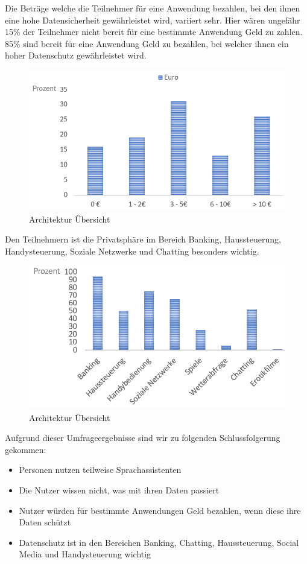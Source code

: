 Die Beträge welche die Teilnehmer für eine Anwendung bezahlen, bei den ihnen eine hohe Datensicherheit gewährleistet wird, variiert sehr. Hier wären ungefähr 15\% der Teilnehmer nicht bereit für eine bestimmte Anwendung Geld zu zahlen. 85\% sind bereit für eine Anwendung Geld zu bezahlen, bei welcher ihnen ein hoher Datenschutz gewährleistet wird. 

\begin{figure}[h!]
	\centering
	\includegraphics[width=0.7\linewidth]{Picture/umfrage_betrag}
	\caption[Architektur Übersicht]{Architektur Übersicht}
	\label{fig:umfrage_betrag}
\end{figure}

Den Teilnehmern ist die Privatsphäre im Bereich Banking, Haussteuerung, Handysteuerung, Soziale Netzwerke und Chatting besonders wichtig.


\begin{figure}[h!]
	\centering
	\includegraphics[width=0.7\linewidth]{Picture/umfrage_anwendung}
	\caption[Architektur Übersicht]{Architektur Übersicht}
	\label{fig:umfrage_anwendung}
\end{figure}

Aufgrund dieser Umfrageergebnisse sind wir zu folgenden Schlussfolgerung gekommen:
\begin{itemize}

\item Personen nutzen teilweise Sprachassistenten
\item Die Nutzer wissen nicht, was mit ihren Daten passiert
\item Nutzer würden für bestimmte Anwendungen Geld bezahlen, wenn diese ihre Daten schützt
\item Datenschutz ist in den Bereichen Banking, Chatting, Haussteuerung, Social Media und Handysteuerung wichtig
	
	
\end{itemize}

